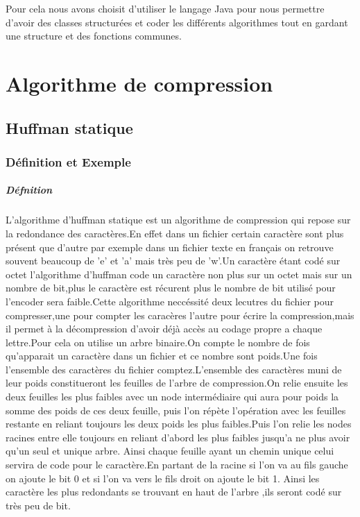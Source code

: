 \documentclass{report}
\begin{document}
Pour cela nous avons choisit d'utiliser le langage Java pour nous permettre d'avoir des classes structurées et coder les différents algorithmes tout en gardant une structure et des fonctions communes.
 \part*{Algorithme de compression}
\chapter*{Huffman statique}
\section*{Définition et Exemple }
\subsubsection*{Défnition}
L'algorithme d'huffman statique est un algorithme de compression qui repose sur la redondance des caractères.En effet dans un fichier certain caractère sont plus présent que d'autre par exemple dans un fichier texte en français on retrouve souvent beaucoup de 'e' et 'a' mais très peu de 'w'.Un caractère étant codé sur octet l'algorithme d'huffman code un caractère non plus sur un octet mais sur un nombre de bit,plus le caractère est récurent plus le nombre de bit utilisé pour l'encoder sera faible.Cette algorithme neccéssité deux lecutres du fichier pour compresser,une pour compter les caracères l'autre pour écrire la compression,mais il permet à la décompression d'avoir déjà accès au codage propre a chaque lettre.Pour cela on utilise un arbre binaire.On compte le nombre de fois qu'apparait un caractère dans un fichier et ce nombre sont poids.Une fois l'ensemble des caractères du fichier comptez.L'ensemble des caractères muni de leur poids constitueront les feuilles de l'arbre de compression.On relie ensuite les deux feuilles les plus faibles avec un node intermédiaire qui aura pour poids la somme des poids de ces deux feuille, puis l'on répète l'opération avec les feuilles restante en reliant toujours les deux poids les plus faibles.Puis l'on relie les nodes racines entre elle toujours en reliant d'abord les plus faibles jusqu'a ne plus avoir qu'un seul et unique arbre. Ainsi chaque feuille ayant un chemin unique celui servira de code pour le caractère.En partant de la racine si l'on va au fils gauche on ajoute le bit 0 et si l'on va vers le fils droit on ajoute le bit 1. Ainsi les caractère les plus redondants se trouvant en haut de l'arbre ,ils seront codé sur très peu de bit.
\end{document}
